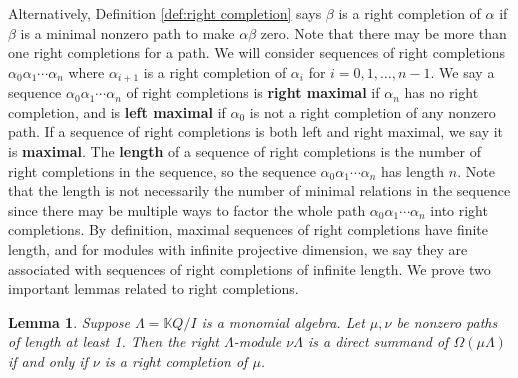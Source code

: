 \documentclass{conm-p-l}
\renewcommand{\k}{\mathbb{K}}
\newtheorem{lemma}[theorem]{Lemma}
\theoremstyle{definition}
\theoremstyle{remark}
\numberwithin{equation}{section}
\begin{document}
Alternatively, Definition \ref{def:right completion} says $\beta$ is a right completion of $\alpha$ if $\beta$ is a minimal nonzero path to make $\alpha\beta$ zero. Note that there may be more than one right completions for a path. We will consider sequences of right completions $\alpha_0\alpha_1\cdots\alpha_n$ where $\alpha_{i+1}$ is a right completion of $\alpha_i$ for $i=0,1,\dots,n-1$. We say a sequence $\alpha_0\alpha_1\cdots\alpha_n$ of right completions is \textbf{right maximal} if $\alpha_n$ has no right completion, and is \textbf{left maximal} if $\alpha_0$ is not a right completion of any nonzero path. If a sequence of right completions is both left and right maximal, we say it is \textbf{maximal}. The \textbf{length} of a sequence of right completions is the number of right completions in the sequence, so the sequence $\alpha_0\alpha_1\cdots\alpha_n$ has length $n$. Note that the length is not necessarily the number of minimal relations in the sequence since there may be multiple ways to factor the whole path $\alpha_0\alpha_1\cdots\alpha_n$ into right completions. By definition, maximal sequences of right completions have finite length, and for modules with infinite projective dimension, we say they are associated with sequences of right completions of infinite length. We prove two important lemmas related to right completions.

\begin{lemma}
\label{lem:syzygy of principal ideals}
Suppose $\Lambda=\k Q/I$ is a monomial algebra. Let $\mu, \nu$ be nonzero paths of length at least 1. Then the right $\Lambda$-module $\nu\Lambda$ is a direct summand of $\Omega (\mu\Lambda)$ if and only if $\nu$ is a right completion of $\mu$.
\end{lemma}
\end{document}
